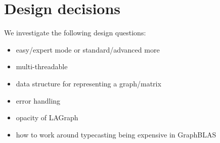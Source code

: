 \section{Design decisions}
\label{sec:decisions}


We investigate the following design questions:

\begin{itemize}
    \item easy/expert mode or standard/advanced more
    \item multi-threadable
    \item data structure for representing a graph/matrix
    \item error handling
    \item opacity of LAGraph
    \item how to work around typecasting being expensive in GraphBLAS
\end{itemize}
